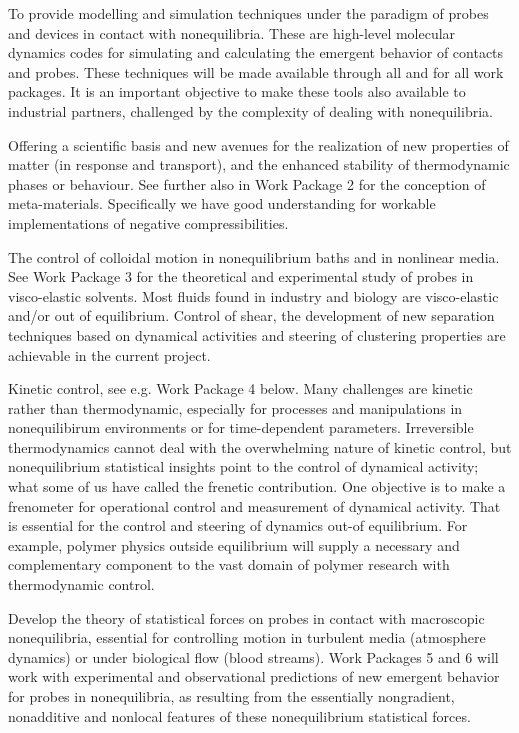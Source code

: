 \begin{inparaenum}[A.]
\item To provide modelling and simulation techniques under the paradigm of probes and
devices in contact with nonequilibria.  These are high-level molecular dynamics codes for
simulating and calculating the emergent behavior of contacts and probes.  These techniques
will be made available through all and for all work packages. It is an important objective
to make these tools also available to industrial partners, challenged by the complexity of
dealing with nonequilibria. 
%
%
\item Offering a scientific basis and new avenues for the realization of new properties of
matter (in response and transport), and the enhanced stability of thermodynamic phases or
behaviour.  See further also in Work Package 2 for the conception of
meta-materials. Specifically we have good understanding for workable implementations of
negative compressibilities.
\item The control of colloidal motion in nonequilibrium baths and in nonlinear media.  See
Work Package 3 for the theoretical and experimental study of probes in visco-elastic
solvents.  Most fluids found in industry and biology are visco-elastic and/or out of
equilibrium.  Control of shear, the development of new separation techniques based on
dynamical activities and steering of clustering properties are achievable in the current
project.
\item Kinetic control, see e.g. Work Package 4 below.  Many challenges are kinetic rather
than thermodynamic, especially for processes and manipulations in nonequilibirum
environments or for time-dependent parameters.  Irreversible thermodynamics cannot deal with
the overwhelming nature of kinetic control, but nonequilibrium statistical insights point to
the control of dynamical activity; what some of us have called the frenetic contribution.
One objective is to make a frenometer for operational control and measurement of dynamical
activity.  That is essential for the control and steering of dynamics out-of equilibrium.
For example, polymer physics outside equilibrium will supply a necessary and complementary
component to the vast domain of polymer research with thermodynamic control.
\item Develop the theory of statistical forces on probes in contact with macroscopic
nonequilibria, essential for controlling motion in turbulent media (atmosphere dynamics) or
under biological flow (blood streams).  Work Packages 5 and 6 will work with experimental
and observational predictions of new emergent behavior for probes in nonequilibria, as
resulting from the essentially nongradient, nonadditive and nonlocal features of these
nonequilibrium statistical forces.
\end{inparaenum}
